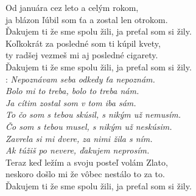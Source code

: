 
Od januára cez leto a celým rokom,\\
ja blázon ľúbil som ťa a zostal len otrokom.\\
Ďakujem ti že sme spolu žili, ja preťal som si žily.\\

Koľkokrát za posledné som ti kúpil kvety,\\
ty radšej vezmeš mi aj posledné cigarety.\\
Ďakujem ti že sme spolu žili, ja preťal som si žily.\\

\textregistered:
\emph{Nepoznávam seba odkedy ťa nepoznám.\\
Bolo mi to treba, bolo to treba nám.\\
Ja cítim zostal som v tom iba sám.}\\

\emph{To čo som s tebou skúsil, s nikým už nemusím.\\
Čo som s tebou musel, s nikým už neskúsim.\\
Zavrela si mi dvere, za nimi žila s ním.\\
Ak túžiš po nevere, ďakujem neprosím.}\\

Teraz keď ležím a svoju posteľ volám Zlato,\\
neskoro došlo mi že vôbec nestálo to za to.\\
Ďakujem ti že sme spolu žili, ja preťal som si žily. \hspace{1cm} \textregistered

\newpage
